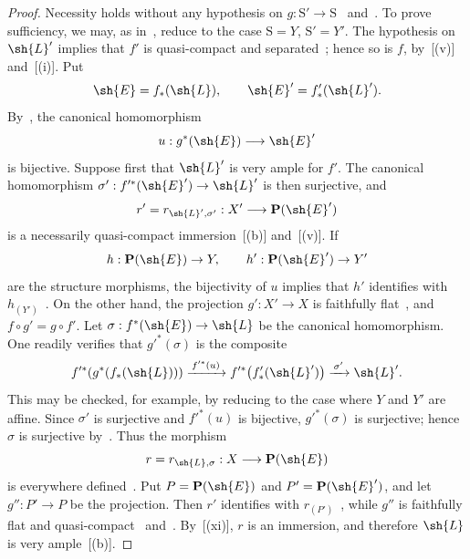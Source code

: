 \begin{proof}
Necessity holds without any hypothesis on
$g:\mathrm{S}'\to\mathrm{S}$~
and~. To prove sufficiency, we may, as
in~, reduce to the case $\mathrm{S}=Y$,
$\mathrm{S}'=Y'$. The hypothesis on $\sh{L}'$ implies that $f'$ is
quasi-compact and separated~; hence so is $f$,
by~[(v)] and~[(i)]. Put
\[
  \sh{E}=f_*(\sh{L}),\qquad
  \sh{E}'=f'_*(\sh{L}').
\]
By~, the canonical homomorphism
\[
  u:g^*(\sh{E})\longrightarrow\sh{E}'
\]
is bijective. Suppose first that $\sh{L}'$ is very ample for $f'$. The
canonical homomorphism
$\sigma':f'^*(\sh{E}')\to\sh{L}'$ is then surjective, and
\[
  r'=r_{\sh{L}',\sigma'}:X'\longrightarrow\mathbf{P}(\sh{E}')
\]
is a necessarily quasi-compact immersion~[(b)]
and~[(v)]. If
\[
  h:\mathbf{P}(\sh{E})\to Y,\qquad
  h':\mathbf{P}(\sh{E}')\to Y'
\]
are the structure morphisms, the bijectivity of $u$ implies that $h'$
identifies with $h_{(Y')}$~. On the other hand,
the projection $g':X'\to X$ is faithfully flat~, and
$f\circ g'=g\circ f'$. Let
$\sigma:f^*(\sh{E})\to\sh{L}$ be the canonical homomorphism. One
readily verifies that $g'^*(\sigma)$ is the composite
\[
  f'^*\!\left(g^*\!\left(f_*(\sh{L})\right)\right)
    \xrightarrow{\,f'^*(u)\,}
  f'^*\!\left(f'_*(\sh{L}')\right)
    \xrightarrow{\,\sigma'\,}
  \sh{L}' .
\]
This may be checked, for example, by reducing to the case where $Y$
and $Y'$ are affine. Since $\sigma'$ is surjective and $f'^*(u)$ is
bijective, $g'^*(\sigma)$ is surjective; hence $\sigma$ is surjective
by~. Thus the morphism
\[
  r=r_{\sh{L},\sigma}:X\longrightarrow\mathbf{P}(\sh{E})
\]
is everywhere defined~. Put
$P=\mathbf{P}(\sh{E})$ and $P'=\mathbf{P}(\sh{E}')$, and let
$g'':P'\to P$ be the projection. Then $r'$ identifies with
$r_{(P')}$~, while $g''$ is faithfully flat and
quasi-compact~ and~.
By~[(xi)], $r$ is an immersion, and therefore
$\sh{L}$ is very ample~[(b)].


\end{proof}
